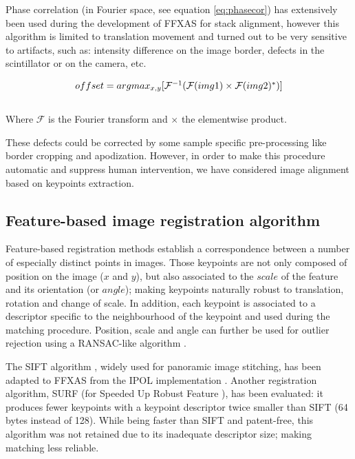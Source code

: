 \documentclass[preprint]{iucr}
\begin{document}
Phase correlation (in Fourier space, see equation \ref{eq:phasecor}) has
extensively been used during the development of FFXAS for stack alignment, however this algorithm is limited to
translation movement and turned out to be very sensitive to artifacts, such as:
intensity difference on the image border, defects in the scintillator or on
the camera, etc.

\begin{center}
\begin{equation}
\label{eq:phasecor}
$$offset =
argmax_{x,y}[\mathcal{F}^{-1}(\mathcal{F}(img1)\times\mathcal{F}(img2)^*)]$$
\end{equation}
\\Where $\mathcal{F}$ is the Fourier transform and $\times$ the elementwise
product.
\end{center}


These defects could be corrected by some sample
specific pre-processing like border cropping and apodization.
However, in order to make this procedure automatic and suppress human intervention, we
have considered image alignment based on keypoints extraction.


\subsection{Feature-based image registration algorithm}

Feature-based registration methods establish a correspondence between a
number of especially distinct points in images.
Those keypoints are not only composed of position on the image ($x$ and $y$),
but also associated to the $scale$ of the feature and its
orientation (or $angle$);
making keypoints naturally robust to
translation, rotation and change of scale.
In addition, each keypoint is associated to a descriptor specific to the
neighbourhood of the keypoint and used during the matching procedure. Position,
scale and angle can further be used for outlier rejection using a RANSAC-like
algorithm \cite{orsa}.

The SIFT algorithm \cite{Lowe99,Lowe04}, widely used for panoramic image
stitching, has been adapted to FFXAS from the IPOL implementation \cite{ASIFT}.
Another registration algorithm, SURF (for Speeded Up Robust Feature
\cite{surf}), has been evaluated: it produces fewer keypoints with a keypoint
descriptor twice smaller than SIFT (64 bytes instead of 128).
While being faster than SIFT and patent-free, this algorithm was not
retained due to its inadequate descriptor size; 
making matching less reliable.
\end{document}

